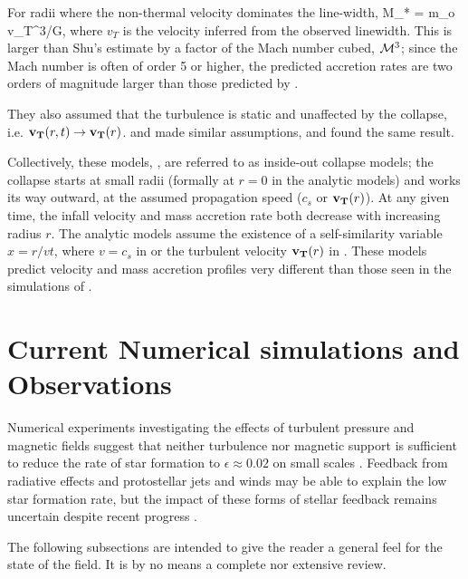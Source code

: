 \documentclass[../dissertation.tex]{subfiles}
\begin{document}
For radii where the non-thermal velocity dominates the line-width, 
%
\be
\dot M_* = m_o v_T^3/G,
\ee
%
where $v_T$ is the velocity inferred from the observed linewidth. 
This is larger than Shu's estimate by a factor of the Mach number cubed, ${\cal M}^3$; since the Mach number is often of order 5 or higher, the predicted accretion rates are two orders of magnitude larger than those predicted by \citet{1977ApJ...214..488S}.

They also assumed that the turbulence is static and unaffected by the collapse, i.e. $\mathbf{v_T} (r,t) \rightarrow \mathbf{v_T} (r)$.  
\citet{1997ApJ...476..750M} and \citet{2003ApJ...585..850M} made similar assumptions, and found the same result.  

Collectively, these models, \citep{1977ApJ...214..488S,1992ApJ...396..631M,1997ApJ...476..750M,2003ApJ...585..850M}, 
are referred to as inside-out collapse models; the collapse starts at small radii (formally at $r=0$ in the analytic models) 
and works its way outward, at the assumed propagation speed ($c_s$ or $\mathbf{v_T} (r)$). 
At any given time, the infall velocity and mass accretion rate both decrease with increasing radius $r$. 
The analytic models assume the existence of a self-similarity variable $x = r/vt$, where $v=c_s$ in 
\citet{1977ApJ...214..488S} or the turbulent velocity $\mathbf{v_T} (r)$ in \citet{1992ApJ...396..631M,1997ApJ...476..750M,2003ApJ...585..850M}.  
These models predict velocity and mass accretion profiles very different than those seen 
in the simulations of \citet{2015ApJ...800...49L}.


\section{Current Numerical simulations and Observations} \label{current_obs}
Numerical experiments investigating the effects of turbulent pressure and magnetic fields suggest that neither turbulence nor magnetic support is sufficient 
to reduce the rate of star formation to $\epsilon\approx 0.02$ on small scales
\citep{2010ApJ...709...27W,2011MNRAS.410L...8C,2011ApJ...730...40P,2012ApJ...754...71K,2014MNRAS.439.3420M}. 
Feedback from radiative effects and protostellar jets and winds may be able to explain the low star formation rate, 
but the impact of these forms of stellar feedback remains uncertain despite recent progress
\citep{2010ApJ...709...27W,2014MNRAS.439.3420M,2015MNRAS.450.4035F}.

The following subsections are intended to give the reader a general feel for the state of the field. 
It is by no means a complete nor extensive review.
\end{document}
